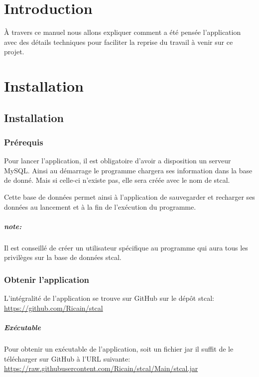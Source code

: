 \documentclass[a4paper,10pt]{report}
\begin{document}
\thispagestyle{headings}


\tableofcontents

\chapter*{Introduction}

À travers ce manuel nous allons expliquer comment a été pensée l'application avec des détails techniques pour faciliter la reprise du travail à venir sur ce projet.

\chapter{Installation}

	\section{Installation}

		\subsection{Prérequis}

			Pour lancer l'application, il est obligatoire d'avoir a disposition un serveur MySQL. Ainsi au démarrage le programme chargera ses information dans la base de donné. Mais si celle-ci n'existe pas, elle sera créée avec le nom de stcal.

			Cette base de données permet ainsi à l'application de sauvegarder et recharger ses données au lancement et à la fin de l’exécution du programme.

			\paragraph*{note:}
			  Il est conseillé de créer un utilisateur spécifique au programme qui aura tous les privilèges sur la base de données stcal.

		\subsection{Obtenir l'application}

			L'intégralité de l'application se trouve sur GitHub sur le dépôt stcal: \href{https://github.com/Ricain/stcal}{https://github.com/Ricain/stcal}
	
			\paragraph[Binaire]{Exécutable}
			  Pour obtenir un exécutable de l'application, soit un fichier jar il suffit de le télécharger sur GitHub à l'URL suivante: \href{https://raw.githubusercontent.com/Ricain/stcal/Main/stcal.jar}{https://raw.githubusercontent.com/Ricain/stcal/Main/stcal.jar}
\end{document}
